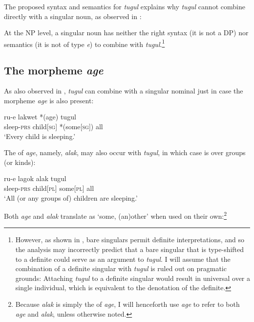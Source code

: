 \documentclass[output=paper]{LSP/langsci}
\begin{document}
The proposed syntax and semantics for \textit{tugul} explains why \textit{tugul} cannot combine directly with a singular noun, as observed in :

\z

\noindent At the NP level, a singular noun has neither the right syntax (it is not a DP) nor semantics (it is not of type \textit{e}) to combine with \textit{tugul}.\footnote{However, as shown in , bare singulars permit definite interpretations, and so the analysis may incorrectly predict that a bare singular that is type-shifted to a definite could serve as an argument to \textit{tugul}. I will assume that the combination of a definite singular with \textit{tugul} is ruled out on pragmatic grounds: Attaching \textit{tugul} to a definite singular would result in universal  over a single individual, which is equivalent to the denotation of the definite.}   

\subsection{The morpheme \textit{age}}
As also observed in , \textit{tugul} can combine with a singular nominal just in case the morpheme \textit{age} is also present:

\ea \label{ex:landman:agetugul}
\gll ru-e lakwet *(age) tugul\\
       sleep-\textsc{prs} child[\textsc{sg}] *(some[\textsc{sg}]) all\\
  \glt ‘Every child is sleeping.’
\z

\noindent The  of \textit{age}, namely, \textit{alak}, may also occur with \textit{tugul}, in which case  is over groups (or kinds):

\ea \label{ex:landman:alaktugul}
\gll ru-e lagok alak tugul\\
       sleep-\textsc{prs} child[\textsc{pl}] some[\textsc{pl}] all\\
  \glt ‘All (or any groups of) children are sleeping.’
\z
 
\noindent Both \textit{age} and \textit{alak} translate as ‘some, (an)other’ when used on their own:\footnote{Because \textit{alak} is simply the  of \textit{age}, I will henceforth use \textit{age} to refer to both \textit{age} and \textit{alak}, unless otherwise noted.}
\end{document}
